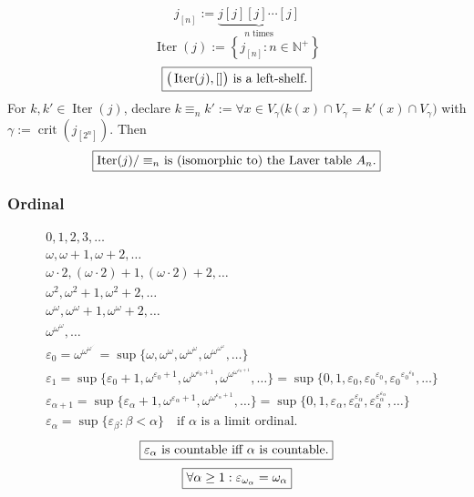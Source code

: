 \documentclass[UTF8,aspectratio=43,11pt,colorlinks,compress,openany]{beamer}%
\begin{document}
\begin{frame}\frametitle{}
\[j_{[n]}:=\underbrace{j[j][j]\cdots[j]}_{n\;\text{times}}\]
\[\operatorname{Iter}(j):=\left\{j_{[n]}: n\in\mathbb{N}^+\right\}\]
\[\fbox{$\big(\operatorname{Iter}(j),[]\big)$ is a left-shelf.}\]
For $k,k'\in\operatorname{Iter}(j)$, declare $k\equiv_n k':=\forall x\in V_\gamma\big(k(x)\cap V_\gamma=k'(x)\cap V_\gamma\big)$ with $\gamma:=\operatorname{crit}(j_{[2^n]})$. Then 
\[\fbox{$\operatorname{Iter}(j)/\equiv_n$ is (isomorphic to) the Laver table $A_n$.}\]
\end{frame}

\begin{frame}\frametitle{Ordinal}\vspace{-3ex}
\begin{align*}
			&0, 1, 2, 3,\dots\\
			&\omega, \omega+1, \omega+2,\dots\\
			&\omega\cdot 2, (\omega \cdot 2)+1, (\omega \cdot 2)+2,\dots\\
			&\omega^2, \omega^2+1, \omega^2+2,\dots\\
			&\omega^{\omega}, \omega^{\omega}+1, \omega^{\omega}+2,\dots\\
			&\omega^{\omega^{\omega}},\dots\\
			&\varepsilon_0=\omega^{\omega^{\omega^{\cdot^{\cdot^{\cdot}}}}}=\sup\{\omega,\omega^{\omega},\omega^{\omega^{\omega}},\omega^{\omega^{\omega^{\omega}}},\dots\}\\
			&\varepsilon_1=\sup\{\varepsilon_0+1,\omega^{\varepsilon_0+1},\omega^{\omega^{\varepsilon_0+1}},\omega^{\omega^{\omega^{\varepsilon_0+1}}},\dots\}=\sup\{0,1,\varepsilon_0,{\varepsilon_0}^{\varepsilon_0},{\varepsilon_0}^{{\varepsilon_0}^{\varepsilon_0}},\ldots\}\\
			&\varepsilon_{\alpha+1}=\sup\{\varepsilon_{\alpha }+1,\omega^{\varepsilon_{\alpha }+1},\omega ^{\omega^{\varepsilon_{\alpha }+1}},\dots \}=\sup\{0,1,\varepsilon_{\alpha },\varepsilon_{\alpha }^{\varepsilon_{\alpha }},\varepsilon_{\alpha }^{\varepsilon_{\alpha }^{\varepsilon_{\alpha }}},\dots\}\\
			&\varepsilon_\alpha=\sup\{\varepsilon _{\beta}:\beta<\alpha\}\quad\mbox{if $\alpha$ is a limit ordinal.}
			\end{align*}
			\[\fbox{$\varepsilon_\alpha$ is countable iff $\alpha$ is countable.}\]
			\[\fbox{$\forall \alpha \geq 1:\varepsilon_{\omega_\alpha}=\omega_\alpha$}\]
\end{frame}
\end{document}
